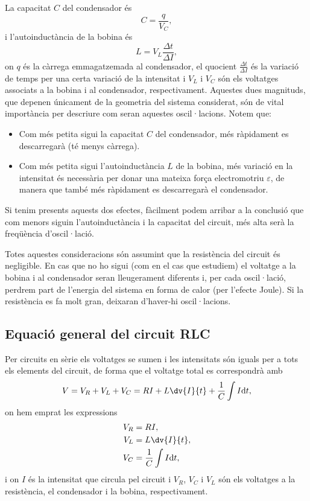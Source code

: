 \documentclass[a4paper,10.5pt]{report}
\begin{document}
La capacitat $C$ del condensador és
\begin{equation}
	C = \frac{q}{V_C}, \label{eq:3.2}
\end{equation}
i l'autoinductància de la bobina és
\begin{equation}
	L = V_L \frac{\Delta t}{\Delta I}, \label{eq:3.3}
\end{equation}
on $q$ és la càrrega emmagatzemada al condensador, el quocient $\frac{\Delta t}{\Delta I}$ és la variació de temps per una certa variació de la intensitat i  $V_L$ i $V_C$ són els voltatges associats a la bobina i al condensador, respectivament. Aquestes dues magnituds, que depenen únicament de la geometria del sistema considerat, són de vital importància per descriure com seran aquestes oscil·lacions. Notem que: 
\begin{itemize}
	\item Com més petita sigui la capacitat $C$ del condensador, més ràpidament es descarregarà (té menys càrrega).
	\item Com més petita sigui l'autoinductància $L$ de la bobina, més variació en la intensitat és necessària per donar una mateixa força electromotriu $\varepsilon$, de manera que també més ràpidament es descarregarà el condensador.
\end{itemize}
Si tenim presents aquests dos efectes, fàcilment podem arribar a la conclusió que com menors siguin l'autoinductància i la capacitat del circuit, més alta serà la freqüència d'oscil·lació.

Totes aquestes consideracions són assumint que la resistència del circuit és negligible. En cas que no ho sigui (com en el cas que estudiem) el voltatge a la bobina i al condensador seran lleugerament diferents i, per cada oscil·lació, perdrem part de l'energia del sistema en forma de calor (per l'efecte Joule). Si la resistència es fa molt gran, deixaran d'haver-hi oscil·lacions.

\subsection{Equació general del circuit RLC}
Per circuits en sèrie els voltatges se sumen i les intensitats són iguals per a tots els elements del circuit, de forma que el voltatge total es correspondrà amb
\begin{equation}
	V = V_R + V_L + V_C = RI + L \dv{I}{t} + \frac{1}{C} \int I\mathrm{d}t, \label{eq:3.4}
\end{equation}
on hem emprat les expressions 
\begin{align}
	V_R & = RI, \\
	V_L & = L \dv{I}{t}, \\
	V_C & = \frac{1}{C} \int I \mathrm{d}t,
\end{align}
i on $I$ és la intensitat que circula pel circuit i $V_R$, $V_C$ i $V_L$ són els voltatges a la resistència, el condensador i la bobina, respectivament. 
\end{document}
